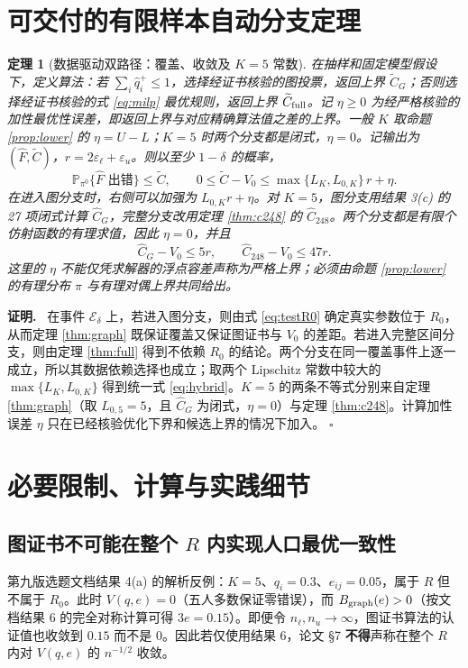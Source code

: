 \documentclass[11pt,a4paper]{ctexart}
\newtheorem{theorem}{定理}[section]
\theoremstyle{definition}
\newenvironment{proofcn}{\par\noindent\textbf{证明.}\ }{\hfill$\square$\par}
\newcommand{\Pp}{\mathbb P}
\newcommand{\epsl}{\varepsilon_{\ell}}
\newcommand{\epsu}{\varepsilon_u}
\newcommand{\hC}{\widehat C}
\begin{document}
\section{可交付的有限样本自动分支定理}
\begin{theorem}[数据驱动双路径：覆盖、收敛及 $K=5$ 常数]\label{thm:hybrid}
在抽样和固定模型假设下，定义算法：若 $\sum_i\hat q_i^+\le1$，选择经证书核验的图投票，返回上界 $\widetilde C_G$；否则选择经证书核验的式 \eqref{eq:milp} 最优规则，返回上界 $\widetilde C_{\rm full}$。记 $\eta\ge0$ 为经\emph{严格核验}的加性最优性误差，即返回上界与对应精确算法值之差的上界。一般 $K$ 取命题 \ref{prop:lower} 的 $\eta=U-L$；$K=5$ 时两个分支都是闭式，$\eta=0$。记输出为 $(\widehat F,\widetilde C)$，$r=2\epsl+\epsu$。则以至少 $1-\delta$ 的概率，
\begin{equation}\label{eq:hybrid}
\Pp_{\pi^0}\{\widehat F\text{ 出错}\}\le\widetilde C,
\qquad0\le\widetilde C-V_0\le \max\{L_K,L_{0,K}\}\, r+\eta.
\end{equation}
在进入图分支时，右侧可以加强为 $L_{0,K}r+\eta$。对 $K=5$，图分支用结果 3(c) 的 27 项闭式计算 $\hC_G$，完整分支改用定理 \ref{thm:c248} 的 $\hC_{248}$。两个分支都是有限个仿射函数的有理求值，因此 $\eta=0$，并且
\[
\hC_G-V_0\le 5r,\qquad
\hC_{248}-V_0\le47r.
\]
这里的 $\eta$ 不能仅凭求解器的浮点容差声称为严格上界；必须由命题 \ref{prop:lower} 的有理分布 $\pi$ 与有理对偶上界共同给出。
\end{theorem}
\begin{proofcn}
在事件 $\mathcal E_\delta$ 上，若进入图分支，则由式 \eqref{eq:testR0} 确定真实参数位于 $R_0$，从而定理 \ref{thm:graph} 既保证覆盖又保证图证书与 $V_0$ 的差距。若进入完整区间分支，则由定理 \ref{thm:full} 得到不依赖 $R_0$ 的结论。两个分支在同一覆盖事件上逐一成立，所以其数据依赖选择也成立；取两个 Lipschitz 常数中较大的 $\max\{L_K,L_{0,K}\}$ 得到统一式 \eqref{eq:hybrid}。$K=5$ 的两条不等式分别来自定理 \ref{thm:graph}（取 $L_{0,5}=5$，且 $\hC_G$ 为闭式，$\eta=0$）与定理 \ref{thm:c248}。计算加性误差 $\eta$ 只在已经核验优化下界和候选上界的情况下加入。
\end{proofcn}

\section{必要限制、计算与实践细节}
\subsection{图证书不可能在整个 $R$ 内实现人口最优一致性}
第九版选题文档结果 4(a) 的解析反例：$K=5$、$q_i=0.3$、$e_{ij}=0.05$，属于 $R$ 但不属于 $R_0$。此时 $V(q,e)=0$（五人多数保证零错误），而 $B_{\rm graph}(e)>0$（按文档结果 6 的完全对称计算可得 $3e=0.15$）。即便令 $n_\ell,n_u\to\infty$，图证书算法的认证值也收敛到 $0.15$ 而不是 $0$。因此若仅使用结果 6，论文 \S7 \textbf{不得}声称在整个 $R$ 内对 $V(q,e)$ 的 $n^{-1/2}$ 收敛。
\end{document}
